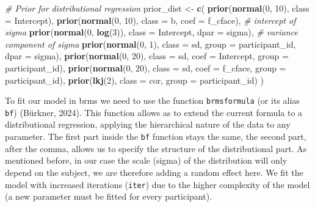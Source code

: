 \documentclass[
  doc,12pt,floatsintext]{apa7}
\newenvironment{Shaded}{\begin{snugshade}}{\end{snugshade}}
\newcommand{\AttributeTok}[1]{\textcolor[rgb]{0.13,0.29,0.53}{#1}}
\newcommand{\CommentTok}[1]{\textcolor[rgb]{0.56,0.35,0.01}{\textit{#1}}}
\newcommand{\DecValTok}[1]{\textcolor[rgb]{0.00,0.00,0.81}{#1}}
\newcommand{\FunctionTok}[1]{\textcolor[rgb]{0.13,0.29,0.53}{\textbf{#1}}}
\newcommand{\NormalTok}[1]{#1}
\newcommand{\OtherTok}[1]{\textcolor[rgb]{0.56,0.35,0.01}{#1}}
\begin{document}
\begin{Shaded}
\begin{Highlighting}[]
\CommentTok{\# Prior for distributional regression}
\NormalTok{prior\_dist }\OtherTok{\textless{}{-}} \FunctionTok{c}\NormalTok{(}
  \FunctionTok{prior}\NormalTok{(}\FunctionTok{normal}\NormalTok{(}\DecValTok{0}\NormalTok{, }\DecValTok{10}\NormalTok{), }\AttributeTok{class =}\NormalTok{ Intercept), }
  \FunctionTok{prior}\NormalTok{(}\FunctionTok{normal}\NormalTok{(}\DecValTok{0}\NormalTok{, }\DecValTok{10}\NormalTok{), }\AttributeTok{class =}\NormalTok{ b, }\AttributeTok{coef =}\NormalTok{ f\_cface),}
  \CommentTok{\# intercept of sigma}
  \FunctionTok{prior}\NormalTok{(}\FunctionTok{normal}\NormalTok{(}\DecValTok{0}\NormalTok{, }\FunctionTok{log}\NormalTok{(}\DecValTok{3}\NormalTok{)), }\AttributeTok{class =}\NormalTok{ Intercept, }\AttributeTok{dpar =}\NormalTok{ sigma), }
  \CommentTok{\# variance component of sigma}
  \FunctionTok{prior}\NormalTok{(}\FunctionTok{normal}\NormalTok{(}\DecValTok{0}\NormalTok{, }\DecValTok{1}\NormalTok{), }\AttributeTok{class =}\NormalTok{ sd, }
        \AttributeTok{group =}\NormalTok{ participant\_id, }\AttributeTok{dpar =}\NormalTok{ sigma), }
  \FunctionTok{prior}\NormalTok{(}\FunctionTok{normal}\NormalTok{(}\DecValTok{0}\NormalTok{, }\DecValTok{20}\NormalTok{), }\AttributeTok{class =}\NormalTok{ sd, }\AttributeTok{coef =}\NormalTok{ Intercept, }
        \AttributeTok{group =}\NormalTok{ participant\_id),  }
  \FunctionTok{prior}\NormalTok{(}\FunctionTok{normal}\NormalTok{(}\DecValTok{0}\NormalTok{, }\DecValTok{20}\NormalTok{), }\AttributeTok{class =}\NormalTok{ sd, }\AttributeTok{coef =}\NormalTok{ f\_cface, }
        \AttributeTok{group =}\NormalTok{ participant\_id), }
  \FunctionTok{prior}\NormalTok{(}\FunctionTok{lkj}\NormalTok{(}\DecValTok{2}\NormalTok{), }\AttributeTok{class =}\NormalTok{ cor, }\AttributeTok{group =}\NormalTok{ participant\_id)}
\NormalTok{  ) }
\end{Highlighting}
\end{Shaded}

To fit our model in brms we need to use the function \texttt{brmsformula} (or its alias \texttt{bf}) (Bürkner, 2024). This function allows as to extend the current formula to a distributional regression, applying the hierarchical nature of the data to any parameter. The first part inside the \texttt{bf} function stays the same, the second part, after the comma, allows us to specify the structure of the distributional part. As mentioned before, in our case the scale (sigma) of the distribution will only depend on the subject, we are therefore adding a random effect here. We fit the model with increased iterations (\texttt{iter}) due to the higher complexity of the model (a new parameter must be fitted for every participant).
\end{document}
